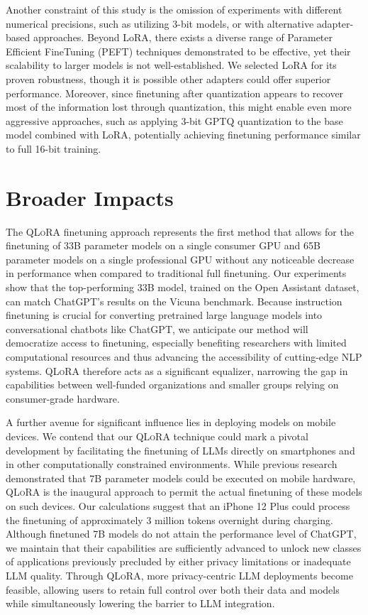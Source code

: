 Another constraint of this study is the omission of experiments with different numerical precisions, such as utilizing 3-bit models, or with alternative adapter-based approaches. Beyond LoRA, there exists a diverse range of Parameter Efficient FineTuning (PEFT) techniques demonstrated to be effective, yet their scalability to larger models is not well-established. We selected LoRA for its proven robustness, though it is possible other adapters could offer superior performance. Moreover, since finetuning after quantization appears to recover most of the information lost through quantization, this might enable even more aggressive approaches, such as applying 3-bit GPTQ quantization to the base model combined with LoRA, potentially achieving finetuning performance similar to full 16-bit training.

\section{Broader Impacts}

The \textsc{QLoRA} finetuning approach represents the first method that allows for the finetuning of 33B parameter models on a single consumer GPU and 65B parameter models on a single professional GPU without any noticeable decrease in performance when compared to traditional full finetuning. Our experiments show that the top-performing 33B model, trained on the Open Assistant dataset, can match ChatGPT’s results on the Vicuna benchmark. Because instruction finetuning is crucial for converting pretrained large language models into conversational chatbots like ChatGPT, we anticipate our method will democratize access to finetuning, especially benefiting researchers with limited computational resources and thus advancing the accessibility of cutting-edge NLP systems. \textsc{QLoRA} therefore acts as a significant equalizer, narrowing the gap in capabilities between well-funded organizations and smaller groups relying on consumer-grade hardware.

A further avenue for significant influence lies in deploying models on mobile devices. We contend that our \textsc{QLoRA} technique could mark a pivotal development by facilitating the finetuning of LLMs directly on smartphones and in other computationally constrained environments. While previous research demonstrated that 7B parameter models could be executed on mobile hardware, \textsc{QLoRA} is the inaugural approach to permit the actual finetuning of these models on such devices. Our calculations suggest that an iPhone 12 Plus could process the finetuning of approximately 3 million tokens overnight during charging. Although finetuned 7B models do not attain the performance level of ChatGPT, we maintain that their capabilities are sufficiently advanced to unlock new classes of applications previously precluded by either privacy limitations or inadequate LLM quality. Through \textsc{QLoRA}, more privacy-centric LLM deployments become feasible, allowing users to retain full control over both their data and models while simultaneously lowering the barrier to LLM integration.

